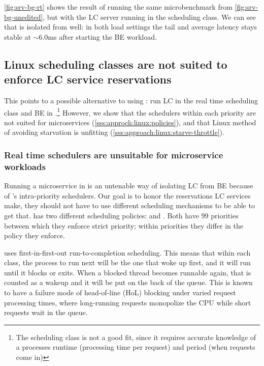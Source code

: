 \autoref{fig:srv-bg-rt} shows the result of running the same microbenchmark from
\autoref{fig:srv-bg-unedited}, but with the LC server running in the \rtclass{}
scheduling class. We can see that \rtclass{} is isolated from \normalclass{}
well: in both load settings the tail and average latency stays stable at
$\sim$6.0ms after starting the BE workload.

\subsection{Linux scheduling classes are not suited to enforce LC service
reservations}\label{ss:approach:linux-classes-bad-fit}

This points to a possible alternative to using \cgroups{}: run LC in the real
time \rtclass{} scheduling class and BE in \normalclass{}.\footnote{The
\deadlineclass{} scheduling class is not a good fit, since it requires accurate
knowledge of a processes runtime (processing time per request) and period (when
requests come in)} However, we show that the schedulers within each priority are
not suited for microservices (\autoref{sss:approch:linux:policies}), and that
Linux method of avoiding starvation is unfitting
(\autoref{sss:approach:linux:starve-throttle}).

\subsubsection{Real time schedulers are unsuitable for microservice
workloads}\label{sss:approch:linux:policies}

Running a microservice in \rtclass{} is an untenable way of isolating LC from BE
because of \rtclass{}'s intra-priority schedulers. Our goal is to honor the
reservations LC services make, they should not have to use different scheduling
mechanisms to be able to get that.  \rtclass{} has two
different scheduling policies: \schedfifo{} and \schedrr{}. Both have 99
priorities between which they enforce strict priority; within priorities they
differ in the policy they enforce.

\schedfifo{} uses first-in-first-out run-to-completion scheduling. This means
that wihin each class, the process to run next will be the one that woke up
first, and it will run until it blocks or exits. When a blocked thread becomes
runnable again, that is counted as a wakeup and it will be put on the back of
the queue. This is known to have a failure mode of head-of-line (HoL) blocking
under varied request processing times, where long-running requests monopolize
the CPU while short requests wait in the queue.

